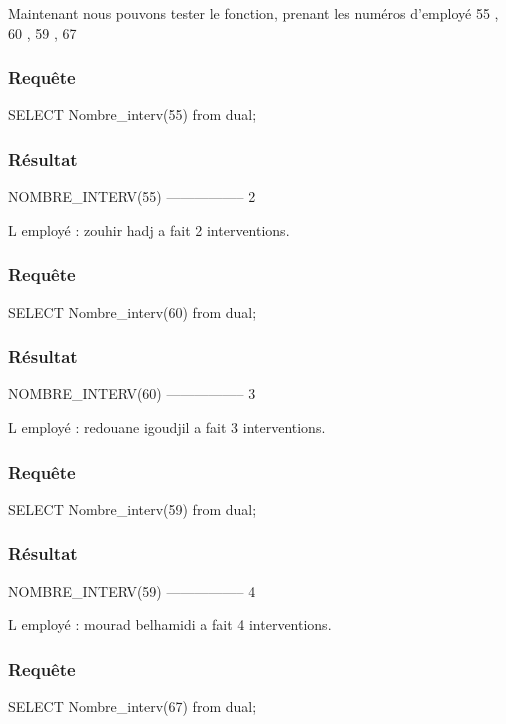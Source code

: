 \documentclass[•]{article}
\begin{document}
Maintenant nous pouvons tester le fonction, prenant les numéros d'employé 55 , 60 , 59 , 67 

\subsubsection{Requête}
\begin{sql}
SELECT Nombre_interv(55) from dual;
\end{sql}
\subsubsection{Résultat}
\begin{sql}
NOMBRE_INTERV(55)
-----------------
                2

L employé : zouhir hadj a fait 2 interventions.
\end{sql}


\subsubsection{Requête}
\begin{sql}
SELECT Nombre_interv(60) from dual;
\end{sql}
\subsubsection{Résultat}
\begin{sql}
NOMBRE_INTERV(60)
-----------------
                3

L employé : redouane igoudjil a fait 3 interventions.
\end{sql}


\subsubsection{Requête}
\begin{sql}
SELECT Nombre_interv(59) from dual;
\end{sql}
\subsubsection{Résultat}
\begin{sql}
NOMBRE_INTERV(59)
-----------------
                4

L employé : mourad belhamidi a fait 4 interventions.
\end{sql}


\subsubsection{Requête}
\begin{sql}
SELECT Nombre_interv(67) from dual;
\end{sql}
\end{document}
